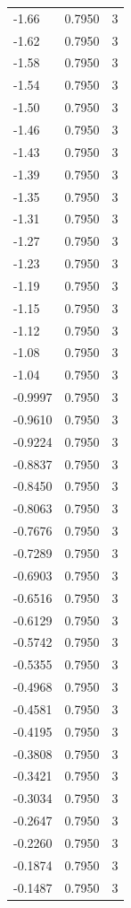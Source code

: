 \begin{longtable}{lrr}
  -1.66 & 0.7950 & 3 \\
  -1.62 & 0.7950 & 3 \\
  -1.58 & 0.7950 & 3 \\
  -1.54 & 0.7950 & 3 \\
  -1.50 & 0.7950 & 3 \\
  -1.46 & 0.7950 & 3 \\
  -1.43 & 0.7950 & 3 \\
  -1.39 & 0.7950 & 3 \\
  -1.35 & 0.7950 & 3 \\
  -1.31 & 0.7950 & 3 \\
  -1.27 & 0.7950 & 3 \\
  -1.23 & 0.7950 & 3 \\
  -1.19 & 0.7950 & 3 \\
  -1.15 & 0.7950 & 3 \\
  -1.12 & 0.7950 & 3 \\
  -1.08 & 0.7950 & 3 \\
  -1.04 & 0.7950 & 3 \\
  -0.9997 & 0.7950 & 3 \\
  -0.9610 & 0.7950 & 3 \\
  -0.9224 & 0.7950 & 3 \\
  -0.8837 & 0.7950 & 3 \\
  -0.8450 & 0.7950 & 3 \\
  -0.8063 & 0.7950 & 3 \\
  -0.7676 & 0.7950 & 3 \\
  -0.7289 & 0.7950 & 3 \\
  -0.6903 & 0.7950 & 3 \\
  -0.6516 & 0.7950 & 3 \\
  -0.6129 & 0.7950 & 3 \\
  -0.5742 & 0.7950 & 3 \\
  -0.5355 & 0.7950 & 3 \\
  -0.4968 & 0.7950 & 3 \\
  -0.4581 & 0.7950 & 3 \\
  -0.4195 & 0.7950 & 3 \\
  -0.3808 & 0.7950 & 3 \\
  -0.3421 & 0.7950 & 3 \\
  -0.3034 & 0.7950 & 3 \\
  -0.2647 & 0.7950 & 3 \\
  -0.2260 & 0.7950 & 3 \\
  -0.1874 & 0.7950 & 3 \\
  -0.1487 & 0.7950 & 3 \\

\end{longtable}

